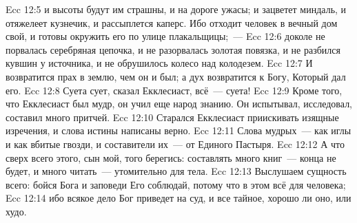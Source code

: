 \vs Ecc 12:5 и высоты будут им страшны, и на дороге ужасы; и зацветет миндаль, и отяжелеет кузнечик, и рассыплется каперс. Ибо отходит человек в вечный дом свой, и готовы окружить его по улице плакальщицы;~---
\vs Ecc 12:6 доколе не порвалась серебряная цепочка, и не разорвалась золотая повязка, и не разбился кувшин у источника, и не обрушилось колесо над колодезем.
\vs Ecc 12:7 И возвратится прах в землю, чем он и был; а дух возвратится к Богу, Который дал его.
\vs Ecc 12:8 Суета сует, сказал Екклесиаст, всё~--- суета!
\rsbpar\vs Ecc 12:9 Кроме того, что Екклесиаст был мудр, он учил еще народ знанию. Он  испытывал, исследовал,  составил много притчей.
\vs Ecc 12:10 Старался Екклесиаст приискивать изящные изречения, и слова истины написаны  верно.
\vs Ecc 12:11 Слова мудрых~--- как иглы и как вбитые гвозди, и составители их~--- от Единого Пастыря.
\vs Ecc 12:12 А что сверх всего этого, сын мой, того берегись: составлять много книг~--- конца не будет, и много читать~--- утомительно для тела.
\rsbpar\vs Ecc 12:13 Выслушаем сущность всего: бойся Бога и заповеди Его соблюдай, потому что в этом всё для человека;
\vs Ecc 12:14 ибо всякое дело Бог приведет на суд, и все тайное, хорошо ли оно, или худо.

